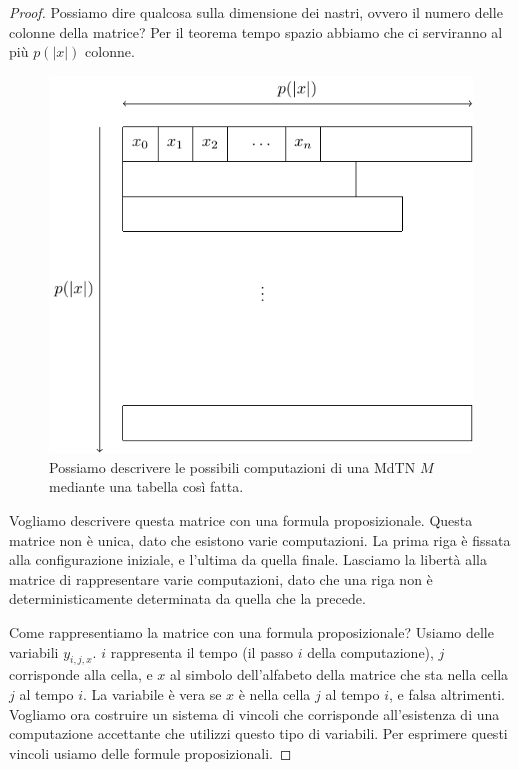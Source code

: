 \begin{proof}
    Possiamo dire qualcosa sulla dimensione dei nastri, ovvero il numero delle colonne della
    matrice?  Per il teorema tempo spazio abbiamo che ci serviranno al più $p(|x|)$ colonne.

    \begin{figure}[h]
        \begin{center}
            \includegraphics{./img/NPClass/SATproof1.pdf}
            \caption{Possiamo descrivere le possibili computazioni di una MdTN $M$ mediante una
            tabella così fatta.}
        \end{center}
    \end{figure}

    Vogliamo descrivere questa matrice con una formula proposizionale. Questa matrice non è unica,
    dato che esistono varie computazioni. La prima riga è fissata alla configurazione iniziale, e
    l'ultima da quella finale. Lasciamo la libertà alla matrice di rappresentare varie
    computazioni, dato che una riga non è deterministicamente determinata da quella che la precede.


    Come rappresentiamo la matrice con una formula proposizionale?
    Usiamo delle variabili $y_{i,j,x}$. $i$ rappresenta il tempo (il passo $i$ della computazione),
    $j$ corrisponde alla cella, e $x$ al simbolo dell'alfabeto della matrice che sta nella cella $j$
    al tempo $i$.  La variabile è vera se $x$ è nella cella $j$ al tempo $i$, e falsa altrimenti.
    Vogliamo ora costruire un sistema di vincoli che corrisponde all'esistenza di una computazione
    accettante che utilizzi questo tipo di variabili. Per esprimere questi vincoli usiamo delle
    formule proposizionali.


\end{proof}

